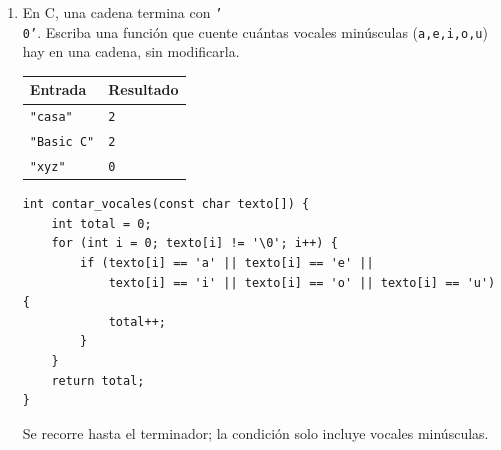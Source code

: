 \begin{enumerate}[label=\textbf{\arabic*.}]
\item En C, una cadena termina con \texttt{'\\0'}. Escriba una función que cuente cuántas vocales minúsculas (\texttt{a,e,i,o,u}) hay en una cadena, sin modificarla.
\begin{center}\begin{tabular}{ll}\toprule\textbf{Entrada} & \textbf{Resultado}\\\midrule\texttt{"casa"} & \texttt{2}\\\texttt{"Basic C"} & \texttt{2}\\\texttt{"xyz"} & \texttt{0}\\\bottomrule\end{tabular}\end{center}
\ifpauta\begin{solucionbox}\begin{lstlisting}[style=customc]
int contar_vocales(const char texto[]) {
    int total = 0;
    for (int i = 0; texto[i] != '\0'; i++) {
        if (texto[i] == 'a' || texto[i] == 'e' ||
            texto[i] == 'i' || texto[i] == 'o' || texto[i] == 'u') {
            total++;
        }
    }
    return total;
}
\end{lstlisting}Se recorre hasta el terminador; la condición solo incluye vocales minúsculas.\end{solucionbox}\else\vspace{3cm}\fi
\end{enumerate}

